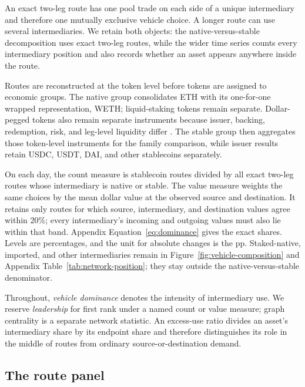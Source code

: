 An exact two-leg route has one pool trade on each side of a unique intermediary and therefore one mutually exclusive vehicle choice. A longer route can use several intermediaries. We retain both objects: the native-versus-stable decomposition uses exact two-leg routes, while the wider time series counts every intermediary position and also records whether an asset appears anywhere inside the route.

Routes are reconstructed at the token level before tokens are assigned to economic groups. The native group consolidates ETH with its one-for-one wrapped representation, WETH; liquid-staking tokens remain separate. Dollar-pegged tokens also remain separate instruments because issuer, backing, redemption, risk, and leg-level liquidity differ \citep{GortonZhang2023Wildcat,CataliniDeGortariShah2022Stablecoins,LyonsViswanathNatraj2023Stablecoins}. The stable group then aggregates those token-level instruments for the family comparison, while issuer results retain USDC, USDT, DAI, and other stablecoins separately.

On each day, the count measure is stablecoin routes divided by all exact two-leg routes whose intermediary is native or stable. The value measure weights the same choices by the mean dollar value at the observed source and destination. It retains only routes for which source, intermediary, and destination values agree within 20\%; every intermediary's incoming and outgoing values must also lie within that band. Appendix Equation~\eqref{eq:dominance} gives the exact shares. Levels are percentages, and the unit for absolute changes is the \ac{pp}. Staked-native, imported, and other intermediaries remain in Figure~\ref{fig:vehicle-composition} and Appendix Table~\ref{tab:network-position}; they stay outside the native-versus-stable denominator.

Throughout, \emph{vehicle dominance} denotes the intensity of intermediary use. We reserve \emph{leadership} for first rank under a named count or value measure; graph centrality is a separate network statistic. An excess-use ratio divides an asset's intermediary share by its endpoint share and therefore distinguishes its role in the middle of routes from ordinary source-or-destination demand.

\subsection{The route panel}
\label{sec:setting:data}

